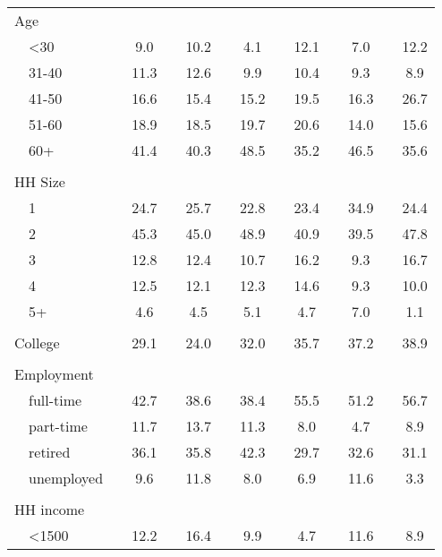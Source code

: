 \documentclass[ProjectABM]{subfiles}
\begin{document}
\begin{table}[]
{\begin{threeparttable}
\begin{tabular}{ll|cccccccccccc}
				\multicolumn{2}{l|}{Age} &  &  &  &  &  &  &  &  &  &  &  &  \\
				& \textless{}30 &  & 9.0 &  & 10.2 &  & 4.1 &  & 12.1 &  & 7.0 &  & 12.2 \\
				& 31-40 &  & 11.3 &  & 12.6 &  & 9.9 &  & 10.4 &  & 9.3 &  & 8.9 \\
				& 41-50 &  & 16.6 &  & 15.4 &  & 15.2 &  & 19.5 &  & 16.3 &  & 26.7 \\
				& 51-60 &  & 18.9 &  & 18.5 &  & 19.7 &  & 20.6 &  & 14.0 &  & 15.6 \\
				& 60+ &  & 41.4 &  & 40.3 &  & 48.5 &  & 35.2 &  & 46.5 &  & 35.6 \\
				&  &  &  &  &  &  &  &  &  &  &  &  &  \\
				\multicolumn{2}{l|}{HH Size} &  &  &  &  &  &  &  &  &  &  &  &  \\
				& 1 &  & 24.7 &  & 25.7 &  & 22.8 &  & 23.4 &  & 34.9 &  & 24.4 \\
				& 2 &  & 45.3 &  & 45.0 &  & 48.9 &  & 40.9 &  & 39.5 &  & 47.8 \\
				& 3 &  & 12.8 &  & 12.4 &  & 10.7 &  & 16.2 &  & 9.3 &  & 16.7 \\
				& 4 &  & 12.5 &  & 12.1 &  & 12.3 &  & 14.6 &  & 9.3 &  & 10.0 \\
				& 5+ &  & 4.6 &  & 4.5 &  & 5.1 &  & 4.7 &  & 7.0 &  & 1.1 \\
				&  &  &  &  &  &  &  &  &  &  &  &  &  \\
				\multicolumn{2}{l|}{College} &  & 29.1 &  & 24.0 &  & 32.0 &  & 35.7 &  & 37.2 &  & 38.9 \\
				&  &  &  &  &  &  &  &  &  &  &  &  &  \\
				\multicolumn{2}{l|}{Employment} &  &  &  &  &  &  &  &  &  &  &  &  \\
				& full-time &  & 42.7 &  & 38.6 &  & 38.4 &  & 55.5 &  & 51.2 &  & 56.7 \\
				& part-time &  & 11.7 &  & 13.7 &  & 11.3 &  & 8.0 &  & 4.7 &  & 8.9 \\
				& retired &  & 36.1 &  & 35.8 &  & 42.3 &  & 29.7 &  & 32.6 &  & 31.1 \\
				& unemployed &  & 9.6 &  & 11.8 &  & 8.0 &  & 6.9 &  & 11.6 &  & 3.3 \\
				&  &  &  &  &  &  &  &  &  &  &  &  &  \\
				\multicolumn{2}{l|}{HH income} &  &  &  &  &  &  &  &  &  &  &  &  \\
				& \textless{}1500 &  & 12.2 &  & 16.4 &  & 9.9 &  & 4.7 &  & 11.6 &  & 8.9 \\

\end{tabular}
\end{threeparttable}}
\end{table}
\end{document}
